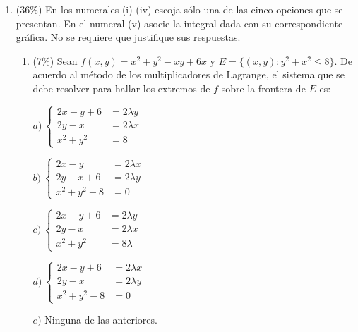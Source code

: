 \documentclass[11pt]{article}
\begin{document}
\vspace{10pt}
\begin{enumerate}
\item{} (36\%) En los numerales (i)-(iv) escoja sólo una de las cinco opciones que se presentan. En el numeral (v) asocie la integral dada con su correspondiente gráfica. No se requiere que justifique sus respuestas.

\begin{enumerate}
\item{} (7\%) Sean $f(x,y)=x^2+y^2-xy+6x$ y $E=\{(x,y): y^2+x^2\leq 8\}$. De acuerdo al método de los multiplicadores de Lagrange, el sistema que se debe resolver para hallar los extremos de $f$ sobre la frontera de $E$ es:

\vspace{4pt}
\noindent
\begin{minipage}[t]{0.46\linewidth}
$a)\ \left\{\begin{aligned}2x-y+6&=2\lambda y\\ 2y-x&=2\lambda x\\ x^2+y^2&=8\end{aligned}\right.$
\end{minipage}%
\begin{minipage}[t]{0.5\linewidth}
$b)\ \left\{\begin{aligned}2x-y&=2\lambda x\\ 2y-x+6&=2\lambda y\\ x^2+y^2-8&=0\end{aligned}\right.$
\end{minipage}

\vspace{6pt}
\noindent
\begin{minipage}[t]{0.46\linewidth}
$c)\ \left\{\begin{aligned}2x-y+6&=2\lambda y\\ 2y-x&=2\lambda x\\ x^2+y^2&=8\lambda\end{aligned}\right.$
\end{minipage}%
\begin{minipage}[t]{0.5\linewidth}
$d)\ \left\{\begin{aligned}2x-y+6&=2\lambda x\\ 2y-x&=2\lambda y\\ x^2+y^2-8&=0\end{aligned}\right.$
\end{minipage}

\vspace{4pt}
\noindent $e)$ Ninguna de las anteriores.


\end{enumerate}
\end{enumerate}
\end{document}

